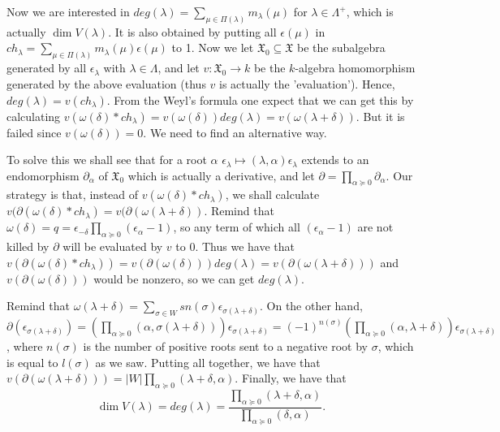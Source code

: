 \documentclass{article}
\begin{document}
Now we are interested in $deg(\lambda) = \sum_{\mu \in \Pi(\lambda)} m_\lambda(\mu)$ for $\lambda \in \Lambda^+$, which is actually $\dim{V(\lambda)}$.
It is also obtained by putting all $\epsilon(\mu)$ in $ch_\lambda = \sum_{\mu \in \Pi(\lambda)} m_\lambda(\mu) \epsilon(\mu)$ to 1.
Now we let $\mathfrak{X}_0 \subseteq \mathfrak{X}$ be the subalgebra generated by all $\epsilon_\lambda$ with $\lambda \in \Lambda$, and let $v : \mathfrak{X}_0 \to k$ be the $k$-algebra homomorphism generated by the above evaluation (thus $v$ is actually the 'evaluation').
Hence, $deg(\lambda) = v(ch_\lambda)$.
From the Weyl's formula one expect that we can get this by calculating $v(\omega(\delta) * ch_\lambda) = v(\omega(\delta)) deg(\lambda) = v(\omega(\lambda + \delta))$.
But it is failed since $v(\omega(\delta)) = 0$.
We need to find an alternative way.

To solve this we shall see that for a root $\alpha$ $\epsilon_\lambda \mapsto (\lambda, \alpha) \epsilon_\lambda$ extends to an endomorphism $\partial_\alpha$ of $\mathfrak{X}_0$ which is actually a derivative, and let $\partial = \prod_{\alpha \succeq 0} \partial_\alpha$.
Our strategy is that, instead of $v(\omega(\delta) * ch_\lambda)$, we shall calculate $v(\partial(\omega(\delta) * ch_\lambda) = v(\partial(\omega(\lambda + \delta))$.
Remind that $\omega(\delta) = q = \epsilon_{-\delta} \prod_{\alpha \succeq 0} (\epsilon_\alpha - 1)$, so any term of which all $(\epsilon_\alpha - 1)$ are not killed by $\partial$ will be evaluated by $v$ to 0.
Thus we have that $v(\partial(\omega(\delta) * ch_\lambda)) = v(\partial(\omega(\delta))) deg(\lambda) = v(\partial(\omega(\lambda + \delta)))$ and $v(\partial(\omega(\delta)))$ would be nonzero, so we can get $deg(\lambda)$.

Remind that $\omega(\lambda + \delta) = \sum_{\sigma \in W} sn(\sigma) \epsilon_{\sigma(\lambda + \delta)}$.
On the other hand, $\partial(\epsilon_{\sigma(\lambda + \delta)}) = (\prod_{\alpha \succeq 0} (\alpha, \sigma(\lambda + \delta))) \epsilon_{\sigma(\lambda + \delta)} = (-1)^{n(\sigma)} (\prod_{\alpha \succeq 0} (\alpha, \lambda + \delta)) \epsilon_{\sigma(\lambda + \delta)}$, where $n(\sigma)$ is the number of positive roots sent to a negative root by $\sigma$, which is equal to $l(\sigma)$ as we saw.
Putting all together, we have that $v(\partial(\omega(\lambda + \delta))) = |W| \prod_{\alpha \succeq 0} (\lambda + \delta, \alpha)$.
Finally, we have that
\begin{displaymath}
  \dim{V(\lambda)} = deg(\lambda) = \frac{\prod_{\alpha \succeq 0} (\lambda + \delta, \alpha)}{\prod_{\alpha \succeq 0} (\delta, \alpha)}.
\end{displaymath}
\end{document}
